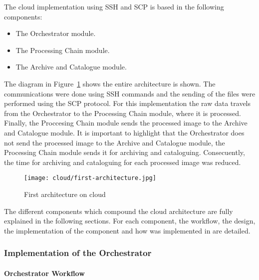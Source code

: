The cloud implementation using \ac{SSH} and \ac{SCP} is based in the following
components:
\begin{itemize}
\item The Orchestrator module.
\item The Processing Chain module.
\item The Archive and Catalogue module.
\end{itemize}

The diagram in Figure~\ref{fig:first-architecture} shows the entire architecture is shown. The
communications were done using \ac{SSH} commands and the sending of the files were
performed using the \ac{SCP} protocol. For this implementation the raw data
travels from the Orchestrator to the Processing Chain module, where it is
processed. Finally, the Proccesing Chain module sends the processed image to the
Archive and
Catalogue module. It is important to highlight that the
Orchestrator does not send the processed image to the Archive and Catalogue
module, the Processing Chain module sends it for archiving and cataloguing. Consecuently, the time for
archiving and cataloguing for each processed image was reduced.

\begin{figure}[!h]
\begin{center}
\texttt{[image: cloud/first-architecture.jpg]}
\caption{First architecture on cloud}
\label{fig:first-architecture}
\end{center}
\end{figure}

The different components which compound the cloud architecture are fully
explained in the following sections. For each component, the  workflow, the
design, the implementation of the component and how was implemented in \bonfire are detailed.

\subsubsection{Implementation of the Orchestrator}

\paragraph{Orchestrator Workflow}~\\

